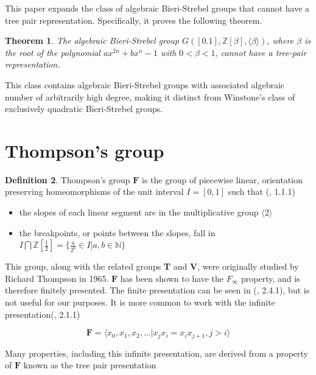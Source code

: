 \documentclass[
11pt, %
english, %
singlespacing, %
parskip, %
headsepline, %
]{amsart} %
\newtheorem{theorem}{Theorem}[section]
\theoremstyle{definition}
\newtheorem{definition}[theorem]{Definition}
\newcommand{\TF}{\textbf{F}}
\begin{document}
This paper expands the class of algebraic Bieri-Strebel groups that cannot have a tree pair representation. Specifically, it proves the following theorem.

\begin{theorem}
The algebraic Bieri-Strebel group $G([0.1], \mathbb{Z}[\beta], \langle \beta \rangle)$, where $\beta$ is the root of the polynomial $ax^{2n}+bx^n-1$ with $0 < \beta <1$, cannot have a tree-pair representation.
\end{theorem}

This class contains algebraic Bieri-Strebel groups with associated algebraic number of arbitrarily high degree, making it distinct from Winstone's class of exclusively quadratic Bieri-Strebel groups.

\section{Thompson's group}

\begin{definition}\label{Fdef}
Thompson's group $\TF$  is the group of piecewise linear, orientation preserving homeomorphisms of the unit interval $I = [0,1]$ such that (\cite{Fbook}, 1.1.1)
\begin{itemize}
\item the slopes of each linear segment are in the multiplicative group $\langle 2 \rangle$
\item the breakpoints, or points between the slopes, fall in $I \bigcap \mathbb{Z}[\frac{1}{2}] = \{\frac{a}{2^b} \in I| a, b \in \mathbb{N}\}$
\end{itemize}
\end{definition}

This group, along with the related groups \textbf{T} and \textbf{V}, were originally studied by Richard Thompson in 1965. $\TF$ has been shown to have the $F_\infty$ property, and is therefore finitely presented. The finite presentation can be seen in (\cite{Fbook}, 2.4.1), but is not useful for our purposes. It is more common to work with the infinite presentation(\cite{Fbook}, 2.1.1)

\begin{equation}\label{Fpres}
\textbf{F} = \langle x_0, x_1, x_2, \dots | x_j x_i = x_i x_{j+1}, j>i \rangle
\end{equation}

Many properties, including this infinite presentation, are derived from a property of $\TF$ known as the tree pair presentation
\end{document}
